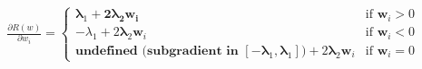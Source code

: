 \documentclass[preview]{standalone}
\begin{document}
\begin{align*}
\frac{\partial R(w)}{\partial w_i} =\begin{cases}\mathbf{\lambda}_1 + \mathbf{2\lambda_2} \mathbf{w_i} & \text{if } \mathbf{w}_i > 0 \\-\lambda_1 + 2\mathbf{\lambda}_2 \mathbf{w}_i & \text{if } \mathbf{w}_i < 0 \\\textbf{undefined (subgradient in } [-\boldsymbol{\lambda}_1, \boldsymbol{\lambda}_1]\textbf{)} + 2\mathbf{\lambda}_2 \mathbf{w}_i & \text{if } \mathbf{w}_i = 0\end{cases}
\end{align*}
\end{document}
